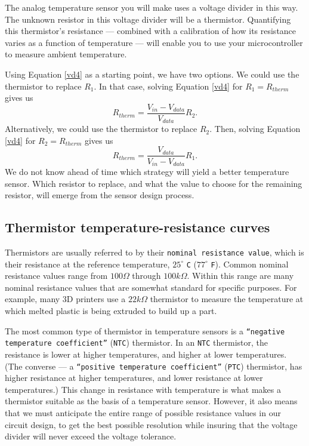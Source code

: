 The analog temperature sensor you will make uses a voltage divider in this way. 
The unknown resistor in this voltage divider will be a thermistor.
Quantifying this thermistor's resistance --- combined with a calibration of how its resistance varies as a function of temperature --- will enable you to use your microcontroller to measure ambient temperature.

Using Equation \ref{vd4} as a starting point, we have two options.
We could use the thermistor to replace $R_1$.
In that case, solving Equation \ref{vd4} for $R_1 = R_{therm}$ gives us 
\begin{equation}\label{therm1}
R_{therm} = \frac{V_{in}-V_{data}}{V_{data}}R_2.
\end{equation}
Alternatively, we could use the thermistor to replace $R_2$.
Then, solving Equation \ref{vd4} for $R_2 = R_{therm}$ gives us 
\begin{equation}\label{therm2}
R_{therm} = \frac{V_{data}}{V_{in}-V_{data}}R_1.
\end{equation}
We do not know ahead of time which strategy will yield a better temperature sensor.
Which resistor to replace, and what the value to choose for the remaining resistor, will emerge from the sensor design process.

\subsection{Thermistor temperature-resistance curves}
Thermistors are usually referred to by their \texttt{nominal resistance value}, which is their resistance at the reference temperature, $25^\circ$ \texttt{C} ($77^\circ$ \texttt{F}).
Common nominal resistance values range from $100\Omega$ through $100k\Omega$.
Within this range are many nominal resistance values that are somewhat standard for specific purposes.
For example, many 3D printers use a $22k\Omega$ thermistor to measure the temperature at which melted plastic is being extruded to build up a part. 

The most common type of thermistor in temperature sensors is a \texttt{``negative temperature coefficient''} (\texttt{NTC}) thermistor.
In an \texttt{NTC} thermistor, the resistance is lower at higher temperatures, and higher at lower temperatures.
(The converse --- a \texttt{``positive temperature coefficient''} (\texttt{PTC}) thermistor, has higher resistance at higher temperatures, and lower resistance at lower temperatures.)
This change in resistance with temperature is what makes a thermistor suitable as the basis of a temperature sensor. 
However, it also means that we must anticipate the entire range of possible resistance values in our circuit design, to get the best possible resolution while insuring that the voltage divider will never exceed the \adc voltage tolerance.


